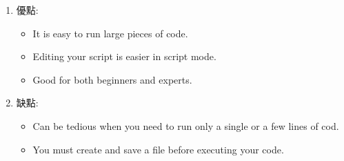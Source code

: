 \documentclass[a4paper,12pt]{article}
\begin{document}
\begin{enumerate}
\begin{enumerate}
\item 優點:
\label{sec:orgd340b7a}
\begin{itemize}
\item It is easy to run large pieces of code.\\
\item Editing your script is easier in script mode.\\
\item Good for both beginners and experts.\\
\end{itemize}
\item 缺點:
\label{sec:orgf5df1d8}
\begin{itemize}
\item Can be tedious when you need to run only a single or a few lines of cod.\\
\item You must create and save a file before executing your code.\\
\end{itemize}
\end{enumerate}
\end{enumerate}
\end{document}
